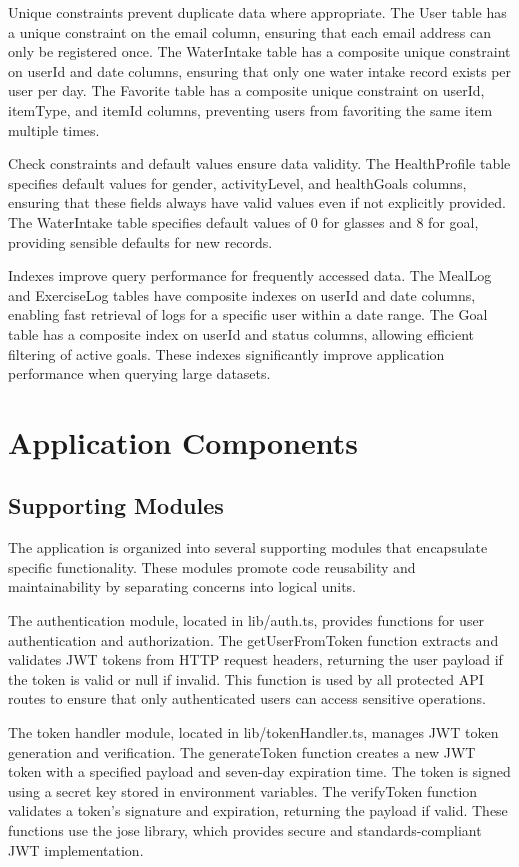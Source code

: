 Unique constraints prevent duplicate data where appropriate. The User table has a unique constraint on the email column, ensuring that each email address can only be registered once. The WaterIntake table has a composite unique constraint on userId and date columns, ensuring that only one water intake record exists per user per day. The Favorite table has a composite unique constraint on userId, itemType, and itemId columns, preventing users from favoriting the same item multiple times.

Check constraints and default values ensure data validity. The HealthProfile table specifies default values for gender, activityLevel, and healthGoals columns, ensuring that these fields always have valid values even if not explicitly provided. The WaterIntake table specifies default values of 0 for glasses and 8 for goal, providing sensible defaults for new records.

Indexes improve query performance for frequently accessed data. The MealLog and ExerciseLog tables have composite indexes on userId and date columns, enabling fast retrieval of logs for a specific user within a date range. The Goal table has a composite index on userId and status columns, allowing efficient filtering of active goals. These indexes significantly improve application performance when querying large datasets.

\section{Application Components}

\subsection{Supporting Modules}

The application is organized into several supporting modules that encapsulate specific functionality. These modules promote code reusability and maintainability by separating concerns into logical units.

The authentication module, located in lib/auth.ts, provides functions for user authentication and authorization. The getUserFromToken function extracts and validates JWT tokens from HTTP request headers, returning the user payload if the token is valid or null if invalid. This function is used by all protected API routes to ensure that only authenticated users can access sensitive operations.

The token handler module, located in lib/tokenHandler.ts, manages JWT token generation and verification. The generateToken function creates a new JWT token with a specified payload and seven-day expiration time. The token is signed using a secret key stored in environment variables. The verifyToken function validates a token's signature and expiration, returning the payload if valid. These functions use the jose library, which provides secure and standards-compliant JWT implementation.

